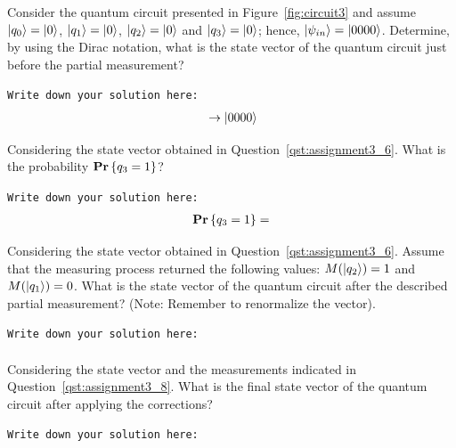 \begin{question}
Consider the quantum circuit presented in Figure~\ref{fig:circuit3} and assume $\ket{q_{0}} = \ket{0}$, $\ket{q_{1}} = \ket{0}$, $\ket{q_{2}} = \ket{0}$ and $\ket{q_{3}} = \ket{0}$; hence, $\ket{\psi_{in}} = \ket{0000}$. Determine, by using the Dirac notation, what is the state vector of the quantum circuit just before the partial measurement?
\label{qst:assignment3_6}
\end{question}
{\small
\texttt{Write down your solution here:}
\begin{equation*}
  \begin{split}
    &\rightarrow \ket{0000} \\
  \end{split}
\end{equation*}}
\vspace{0.1cm}

\begin{question}
Considering the state vector obtained in Question~\ref{qst:assignment3_6}. What is the probability  $\mathbf{Pr}\left\{ q_{3} = 1 \right\}$?
\label{qst:assignment3_7}
\end{question}
{\small
\texttt{Write down your solution here:}
\begin{equation*}
  \begin{split}
    \mathbf{Pr}\left\{ q_{3} = 1 \right\} &=  \\
  \end{split}
\end{equation*}}
\vspace{0.1cm}

\begin{question}
Considering the state vector obtained in Question~\ref{qst:assignment3_6}. Assume that the measuring process returned the following values: $M(\ket{q_{2}}) = 1$ and $M(\ket{q_{1}}) = 0$. What is the state vector of the quantum circuit after the described partial measurement? (Note: Remember to renormalize the vector).
\label{qst:assignment3_8}
\end{question}
{\small
\texttt{Write down your solution here:}
\begin{equation*}
  \begin{split}
  \end{split}
\end{equation*}}
\vspace{0.1cm}

\begin{question}
Considering the state vector and the measurements indicated in Question~\ref{qst:assignment3_8}. What is the final state vector of the quantum circuit after applying the corrections?
\label{qst:assignment3_9}
\end{question}
{\small
\texttt{Write down your solution here:}
\begin{equation*}
  \begin{split}
  \end{split}
\end{equation*}}
\vspace{0.1cm}

